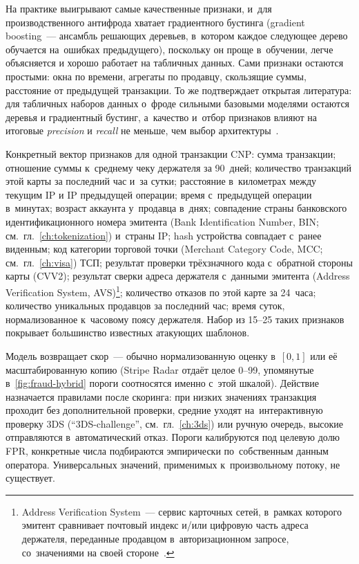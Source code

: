 На практике выигрывают самые качественные признаки, и~для
производственного антифрода хватает градиентного бустинга
(gradient boosting~--- ансамбль решающих деревьев, в~котором
каждое следующее дерево обучается на~ошибках предыдущего),
поскольку он проще в~обучении, легче объясняется и хорошо
работает на табличных данных.
Сами признаки остаются простыми: окна по времени, агрегаты по
продавцу, скользящие суммы, расстояние от предыдущей транзакции.
То же подтверждает открытая литература: для табличных наборов данных
о~фроде сильными базовыми моделями остаются деревья и градиентный
бустинг, а~качество и~отбор признаков влияют на итоговые \textit{precision}
и \textit{recall} не меньше, чем выбор
архитектуры~\cite{fraud-feature-selection-2024,fraud-lightgbm-2024}.

Конкретный вектор признаков для одной транзакции CNP: сумма
транзакции; отношение суммы к~среднему чеку держателя за 90~дней; количество транзакций этой карты за последний
час и~за сутки; расстояние в~километрах между текущим IP
и IP предыдущей операции; время с~предыдущей операции
в~минутах; возраст аккаунта у~продавца в~днях; совпадение
страны банковского идентификационного номера эмитента
(Bank Identification Number, BIN; см.~гл.~\ref{ch:tokenization})
и~страны IP; hash устройства совпадает с~ранее
виденным; код категории торговой точки (Merchant Category Code, MCC;
см.~гл.~\ref{ch:visa}) ТСП; результат проверки трёхзначного кода
с~обратной стороны карты (CVV2); результат сверки адреса держателя
с~данными эмитента (Address Verification System, AVS)\footnote{Address
Verification System~--- сервис карточных сетей, в~рамках которого
эмитент сравнивает почтовый индекс и/или цифровую часть адреса
держателя, переданные продавцом в~авторизационном запросе,
со~значениями на своей стороне~\cite{visa-avs-2024}.};
количество отказов по этой карте за 24~часа; количество уникальных
продавцов за последний час; время суток, нормализованное
к~часовому поясу держателя. Набор из 15--25 таких признаков
покрывает большинство известных атакующих шаблонов.

Модель возвращает скор~--- обычно нормализованную оценку
в~$[0, 1]$ или её масштабированную копию (Stripe Radar отдаёт
целое 0--99, упомянутые в~\autoref{fig:fraud-hybrid} пороги
соотносятся именно с~этой шкалой). Действие назначается правилами
после скоринга: при низких значениях транзакция проходит без
дополнительной проверки, средние уходят на~интерактивную проверку
3DS (\enquote{3DS-challenge}, см.~гл.~\ref{ch:3ds}) или ручную
очередь, высокие отправляются в~автоматический отказ. Пороги
калибруются под целевую долю FPR, конкретные числа подбираются
эмпирически по~собственным данным оператора. Универсальных значений,
применимых к~произвольному потоку, не существует.

